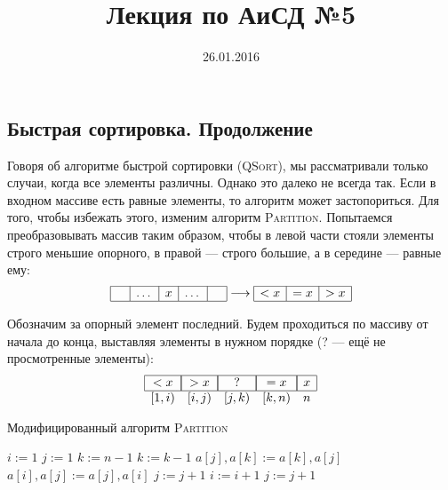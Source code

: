 \documentclass[12pt,a4paper]{article}
\title{Лекция по АиСД №5}
\date{26.01.2016}
\author{}
\begin{document}
\maketitle

\subsection*{Быстрая сортировка. Продолжение}
Говоря об алгоритме быстрой сортировки (\textsc{QSort}), мы рассматривали только случаи, когда все элементы различны. Однако это далеко не всегда так. Если в входном массиве есть равные элементы, то алгоритм может застопориться. Для того, чтобы избежать этого, изменим алгоритм \textsc{Partition}. Попытаемся преобразовывать массив таким образом, чтобы в левой части стояли элементы строго меньшие опорного, в правой --- строго большие, а в середине --- равные ему:
\[\begin{array}{|c|c|c|c|c|}
	\hline
	\phantom{x}  & \dots & x & \dots & \phantom{x}  \\
	\hline
\end{array}
\longrightarrow
\begin{array}{|c|c|c|}
    \hline
    <x&=x&>x\\
    \hline
\end{array}\]

Обозначим за опорный элемент последний. Будем проходиться по массиву от начала до конца, выставляя элементы в нужном порядке (? — ещё не просмотренные элементы):
\[\begin{array}{lllll}
    \hline
   	\multicolumn{1}{|c|}{<x} & \multicolumn{1}{|c|}{>x} & \multicolumn{1}{|c|}{  ?  } & \multicolumn{1}{|c|}{=x} & \multicolumn{1}{|c|}{x}\\
    \hline
    [1, i) & [i, j) & [j, k) & [k, n) & n
\end{array}\]

\begin{algorithm}
\caption{Модифицированный алгоритм \textsc{Partition}}
\begin{algorithmic}[1]
\State $i \mathrel{:=} 1$
\State $j \mathrel{:=} 1$
\State $k \mathrel{:=} n - 1$
		\State $k \mathrel{:=} k - 1$
		\State $a[j], a[k] \mathrel{:=} a[k], a[j]$
	\Else {}
		\State $a[i], a[j] \mathrel{:=} a[j], a[i]$
		\State $j \mathrel{:=} j + 1$
		\State $i \mathrel{:=} i + 1$
	\Else
		\State $j \mathrel{:=} j + 1$
	\EndIf
	\EndIf
\EndWhile
\EndFunction
\end{algorithmic}
\end{algorithm}
\end{document}
